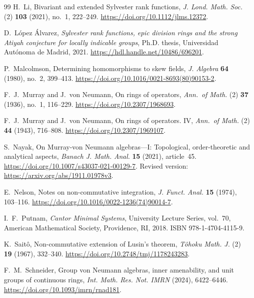 \documentclass[11pt]{amsart}
\theoremstyle{definition}
\theoremstyle{remark}
\begin{document}
\begin{thebibliography}{99}
H.~Li,
\newblock Bivariant and extended Sylvester rank functions,
\newblock \emph{J. Lond. Math. Soc.} (2) \textbf{103} (2021), no.~1, 222--249.
\newblock \url{https://doi.org/10.1112/jlms.12372}.

D.~L\'opez \'Alvarez,
\newblock \emph{Sylvester rank functions, epic division rings and the strong
  Atiyah conjecture for locally indicable groups},
\newblock Ph.D. thesis, Universidad Aut\'onoma de Madrid, 2021.
\newblock \url{https://hdl.handle.net/10486/696201}.

P.~Malcolmson,
\newblock Determining homomorphisms to skew fields,
\newblock \emph{J. Algebra} \textbf{64} (1980), no.~2, 399--413.
\newblock \url{https://doi.org/10.1016/0021-8693(80)90153-2}.

F.~J.~Murray and J.~von Neumann,
\newblock On rings of operators,
\newblock \emph{Ann.\ of Math.} (2) \textbf{37} (1936), no.~1, 116--229.
\newblock \url{https://doi.org/10.2307/1968693}.

F.~J.~Murray and J.~von Neumann,
\newblock On rings of operators. IV,
\newblock \emph{Ann.\ of Math.} (2) \textbf{44} (1943), 716--808.
\newblock \url{https://doi.org/10.2307/1969107}.

S.~Nayak,
\newblock On Murray-von Neumann algebras---I: Topological, order-theoretic
  and analytical aspects,
\newblock \emph{Banach J. Math. Anal.} \textbf{15} (2021), article~45.
\newblock \url{https://doi.org/10.1007/s43037-021-00129-7}.
\newblock Revised version: \url{https://arxiv.org/abs/1911.01978v3}.

E.~Nelson,
\newblock Notes on non-commutative integration,
\newblock \emph{J. Funct. Anal.} \textbf{15} (1974), 103--116.
\newblock \url{https://doi.org/10.1016/0022-1236(74)90014-7}.

I.~F.~Putnam,
\newblock \emph{Cantor Minimal Systems},
\newblock University Lecture Series, vol.~70, American Mathematical Society,
  Providence, RI, 2018.
\newblock ISBN 978-1-4704-4115-9.

K.~Sait\^o,
\newblock Non-commutative extension of Lusin's theorem,
\newblock \emph{T\^ohoku Math. J.} (2) \textbf{19} (1967), 332--340.
\newblock \url{https://doi.org/10.2748/tmj/1178243283}.

F.~M.~Schneider,
\newblock Group von Neumann algebras, inner amenability, and unit groups
  of continuous rings,
\newblock \emph{Int. Math. Res. Not. IMRN} (2024), 6422--6446.
\newblock \url{https://doi.org/10.1093/imrn/rnad181}.


\end{thebibliography}
\end{document}
